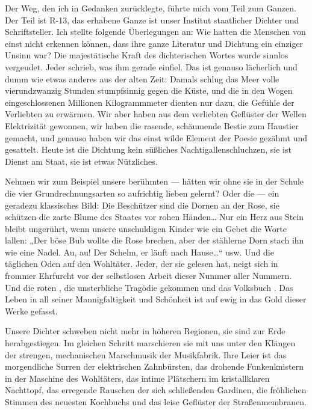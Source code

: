 Der Weg, den ich in Gedanken zurücklegte, führte mich
vom Teil zum Ganzen. Der Teil ist R-13, das erhabene Ganze ist
unser Institut staatlicher Dichter und Schriftsteller. Ich stellte
folgende Überlegungen an: Wie hatten die Menschen von einst nicht
erkennen können, dass ihre ganze Literatur und Dichtung ein
einziger Unsinn war? Die majestätische Kraft des dichterischen
Wortes wurde sinnlos vergeudet. Jeder schrieb, was ihm gerade
einfiel. Das ist genauso lächerlich und dumm wie etwas anderes aus
der alten Zeit: Damals schlug das Meer volle vierundzwanzig Stunden
stumpfsinnig gegen die Küste, und die in den Wogen eingeschlossenen
Millionen Kilogrammmeter dienten nur dazu, die Gefühle der
Verliebten zu erwärmen. Wir aber haben aus dem verliebten Geflüster
der Wellen Elektrizität gewonnen, wir haben die rasende, schäumende
Bestie zum Haustier gemacht, und genauso haben wir das einst wilde
Element der Poesie gezähmt und gesattelt. Heute ist die Dichtung
kein süßliches Nachtigallenschluchzen, sie ist Dienst am Staat, sie
ist etwas Nützliches.

Nehmen wir zum Beispiel unsere berühmten  —
hätten wir ohne sie in der Schule die vier Grundrechnungsarten so
aufrichtig lieben gelernt? Oder die  — ein geradezu
klassisches Bild: Die Beschützer sind die Dornen an der Rose, sie
schützen die zarte Blume des Staates vor rohen Händen\ldots{} Nur ein
Herz aus Stein bleibt ungerührt, wenn unsere unschuldigen Kinder
wie ein Gebet die Worte lallen: „Der böse Bub wollte die Rose
brechen, aber der stählerne Dorn stach ihn wie eine Nadel. Au, au!
Der Schelm, er läuft nach Hause\ldots{}“ usw. Und die täglichen Oden auf %
den Wohltäter. Jeder, der sie gelesen hat, neigt sich in frommer
Ehrfurcht vor der selbstlosen Arbeit dieser Nummer aller Nummern.
Und die roten , die unsterbliche Tragödie
 gekommen und das Volksbuch . Das Leben in all seiner Mannigfaltigkeit und
Schönheit ist auf ewig in das Gold dieser Werke gefasst.

Unsere
Dichter schweben nicht mehr in höheren Regionen, sie sind zur Erde
herabgestiegen. Im gleichen Schritt marschieren sie mit uns unter
den Klängen der strengen, mechanischen Marschmusik der Musikfabrik.
Ihre Leier ist das morgendliche Surren der elektrischen
Zahnbürsten, das drohende Funkenknistern in der Maschine des
Wohltäters, das intime Plätschern im kristallklaren Nachttopf, das
erregende Rauschen der sich schließenden Gardinen, die fröhlichen
Stimmen des neuesten Kochbuchs und das leise Geflüster der
Straßenmembranen.

